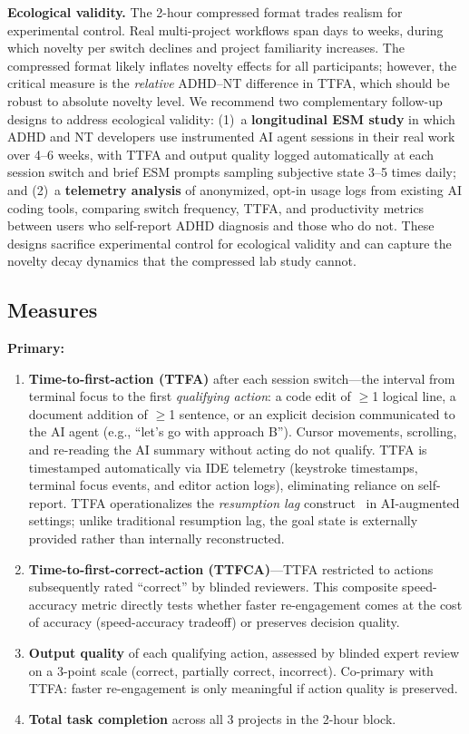 \documentclass[sigconf,nonacm]{acmart}
\begin{document}
\textbf{Ecological validity.} The 2-hour compressed format trades realism for experimental control. Real multi-project workflows span days to weeks, during which novelty per switch declines and project familiarity increases. The compressed format likely inflates novelty effects for all participants; however, the critical measure is the \emph{relative} ADHD--NT difference in TTFA, which should be robust to absolute novelty level. We recommend two complementary follow-up designs to address ecological validity: (1)~a \textbf{longitudinal ESM study} in which ADHD and NT developers use instrumented AI agent sessions in their real work over 4--6 weeks, with TTFA and output quality logged automatically at each session switch and brief ESM prompts sampling subjective state 3--5 times daily; and (2)~a \textbf{telemetry analysis} of anonymized, opt-in usage logs from existing AI coding tools, comparing switch frequency, TTFA, and productivity metrics between users who self-report ADHD diagnosis and those who do not. These designs sacrifice experimental control for ecological validity and can capture the novelty decay dynamics that the compressed lab study cannot.

\subsection{Measures}

\textbf{Primary:}

\begin{enumerate}
\item \textbf{Time-to-first-action (TTFA)} after each session switch---the interval from terminal focus to the first \emph{qualifying action}: a code edit of $\geq$1 logical line, a document addition of $\geq$1 sentence, or an explicit decision communicated to the AI agent (e.g., ``let's go with approach B''). Cursor movements, scrolling, and re-reading the AI summary without acting do not qualify. TTFA is timestamped automatically via IDE telemetry (keystroke timestamps, terminal focus events, and editor action logs), eliminating reliance on self-report. TTFA operationalizes the \emph{resumption lag} construct~\cite{altmann2002} in AI-augmented settings; unlike traditional resumption lag, the goal state is externally provided rather than internally reconstructed.

\item \textbf{Time-to-first-correct-action (TTFCA)}---TTFA restricted to actions subsequently rated ``correct'' by blinded reviewers. This composite speed-accuracy metric directly tests whether faster re-engagement comes at the cost of accuracy (speed-accuracy tradeoff) or preserves decision quality.

\item \textbf{Output quality} of each qualifying action, assessed by blinded expert review on a 3-point scale (correct, partially correct, incorrect). Co-primary with TTFA: faster re-engagement is only meaningful if action quality is preserved.

\item \textbf{Total task completion} across all 3 projects in the 2-hour block.
\end{enumerate}
\end{document}
